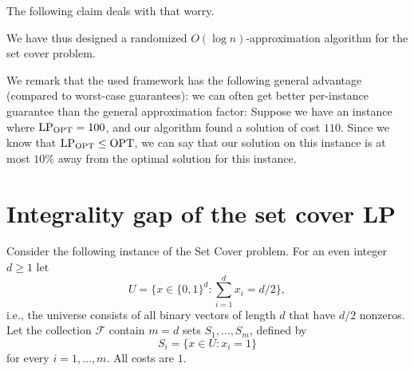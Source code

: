 The following claim deals with that worry.



We have thus designed a randomized $O(\log n)$-approximation algorithm for the set cover problem.

We remark that the used framework has the following general advantage (compared to worst-case
guarantees): we can often get better per-instance guarantee than the general approximation factor:
Suppose we have an instance where $\mathrm{LP}_{\mathrm{OPT}}=100$, and our algorithm found a solution of cost $110$.
Since we know that $\mathrm{LP}_{\mathrm{OPT}}\le\mathrm{OPT}$, we can say that our solution on this instance is at most $10\%$
away from the optimal solution for this instance.

\section{Integrality gap of the set cover LP}

Consider the following instance of the Set Cover problem. For an even integer $d\ge 1$ let
\[
  U=\Big\{x\in\{0,1\}^d:\sum_{i=1}^d x_i=d/2\Big\},
\]
i.e., the universe consists of all binary vectors of length $d$ that have $d/2$ nonzeros. Let the
collection $\mathcal{F}$ contain $m=d$ sets $S_1,\ldots,S_m$, defined by
\[
  S_i=\{x\in U: x_i=1\}
\]
for every $i=1,\ldots,m$. All costs are $1$.

